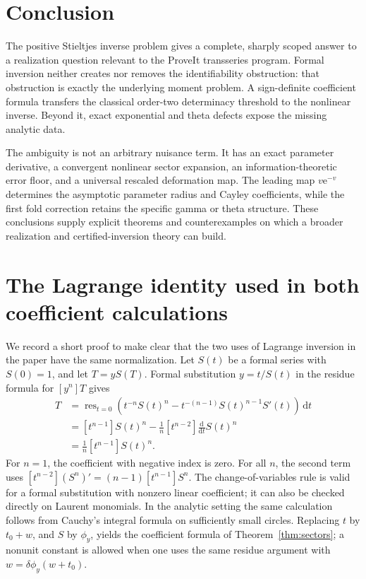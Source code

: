 \documentclass[11pt,a4paper]{article}
\numberwithin{equation}{section}
\theoremstyle{definition}
\theoremstyle{remark}
\newcommand{\dd}{\,\mathrm d}
\newcommand{\ee}{\mathrm e}
\begin{document}
\section{Conclusion}
The positive Stieltjes inverse problem gives a complete, sharply scoped
answer to a realization question relevant to the ProveIt transseries
program. Formal inversion neither creates nor removes the
identifiability obstruction: that obstruction is exactly the underlying
moment problem. A sign-definite coefficient formula transfers the
classical order-two determinacy threshold to the nonlinear inverse.
Beyond it, exact exponential and theta defects expose the missing
analytic data.

The ambiguity is not an arbitrary nuisance term. It has an exact
parameter derivative, a convergent nonlinear sector expansion, an
information-theoretic error floor, and a universal rescaled deformation
map. The leading map \(v\ee^{-v}\) determines the asymptotic parameter
radius and Cayley coefficients, while the first fold correction retains
the specific gamma or theta structure. These conclusions supply
explicit theorems and counterexamples on which a broader realization
and certified-inversion theory can build.

\appendix
\section{The Lagrange identity used in both coefficient calculations}
\label{app:lagrange}
We record a short proof to make clear that the two uses of Lagrange
inversion in the paper have the same normalization. Let \(S(t)\) be a
formal series with \(S(0)=1\), and let \(T=yS(T)\). Formal substitution
\(y=t/S(t)\) in the residue formula for \([y^n]T\) gives
\begin{align*}
 [y^n]T
 &=\operatorname{res}_{t=0}
 \left(t^{-n}S(t)^n-t^{-(n-1)}S(t)^{n-1}S'(t)\right)\dd t\\
 &=[t^{n-1}]S(t)^n
   -\frac1n[t^{n-2}]\frac{\mathrm d}{\mathrm dt}S(t)^n\\
 &=\frac1n[t^{n-1}]S(t)^n.
\end{align*}
For \(n=1\), the coefficient with negative index is zero. For all
\(n\), the second term uses
\([t^{n-2}](S^n)'=(n-1)[t^{n-1}]S^n\).
The change-of-variables rule is valid for a formal substitution with
nonzero linear coefficient; it can also be checked directly on Laurent
monomials. In the analytic setting the same calculation follows from
Cauchy's integral formula on sufficiently small circles. Replacing
\(t\) by \(t_0+w\), and \(S\) by \(\phi_y\), yields the coefficient
formula of Theorem~\ref{thm:sectors}; a nonunit constant is allowed when
one uses the same residue argument with \(w=\delta\phi_y(w+t_0)\).
\end{document}
